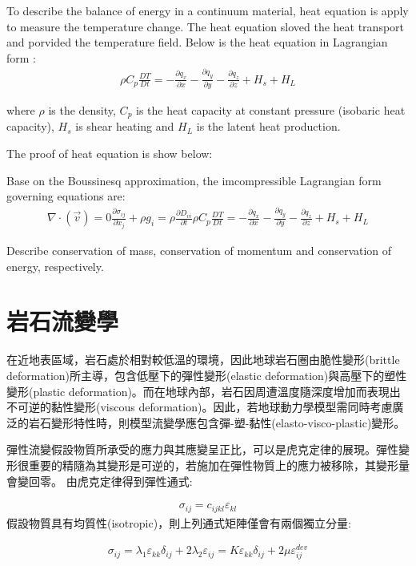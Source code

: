 To describe the balance of energy in a continuum material, heat equation is apply to measure the temperature change. The heat equation sloved the heat transport and porvided the temperature field. Below is the heat equation in Lagrangian form :
\begin{align}
\rho C_p \frac{DT}{Dt} = -\frac{\partial q_x}{\partial x}-\frac{\partial q_y}{\partial y}-\frac{\partial q_z}{\partial z}+H_s+H_L
\end{align}

where $\rho$ is the density, $C_p$ is the heat capacity at constant pressure (isobaric heat capacity), $H_s$ is shear heating and $H_L$ is the latent heat production.

The proof of heat equation is show below:

Base on the Boussinesq approximation, the imcompressible Lagrangian form governing equations are:
\begin{align}
\nabla \cdot (\vec v) = 0 
\frac{\partial \sigma_{ij}}{\partial x_j}+\rho g_i = \rho \frac{\partial D_{vi}}{\partial t}
\rho C_p \frac{DT}{Dt} = -\frac{\partial q_x}{\partial x}-\frac{\partial q_y}{\partial y}-\frac{\partial q_z}{\partial z}+H_s+H_L
\end{align}

Describe conservation of mass, conservation of momentum and conservation of energy, respectively.

\section{岩石流變學}

在近地表區域，岩石處於相對較低溫的環境，因此地球岩石圈由脆性變形(brittle deformation)所主導，包含低壓下的彈性變形(elastic deformation)與高壓下的塑性變形(plastic deformation)。而在地球內部，岩石因周遭溫度隨深度增加而表現出不可逆的黏性變形(viscous deformation)。因此，若地球動力學模型需同時考慮廣泛的岩石變形特性時，則模型流變學應包含彈-塑-黏性(elasto-visco-plastic)變形。

彈性流變假設物質所承受的應力與其應變呈正比，可以是虎克定律的展現。彈性變形很重要的精隨為其變形是可逆的，若施加在彈性物質上的應力被移除，其變形量會變回零。
由虎克定律得到彈性通式:

\begin{align}
𝜎_{𝑖𝑗}=𝑐_{𝑖𝑗𝑘𝑙} 𝜀_{𝑘𝑙}
\end{align}
假設物質具有均質性(isotropic)，則上列通式矩陣僅會有兩個獨立分量:

\begin{align}
    σ_{ij}=λ_1 ε_{kk} δ_{ij}+2 λ_2 ε_{ij}=Kε_{kk} δ_{ij}+2 \mu ε_{ij}^{dev} \label{eqn:elastic tensor}
\end{align}

